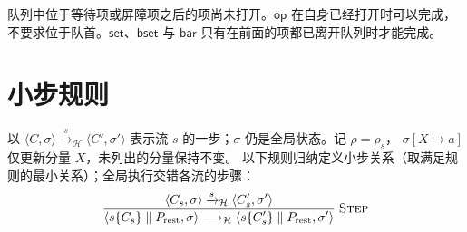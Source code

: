 \documentclass[UTF8,a4paper,11pt,fontset=fandol]{ctexart}
\newcommand{\kw}[1]{\ensuremath{\mathsf{#1}}}
\newcommand{\infer}[2]{\displaystyle\frac{\displaystyle #1}{\displaystyle #2}}
\begin{document}
队列中位于等待项或屏障项之后的项尚未打开。$\kw{op}$ 在自身已经打开时可以完成，不要求位于队首。$\kw{set}$、$\kw{bset}$ 与 $\kw{bar}$ 只有在前面的项都已离开队列时才能完成。

\clearpage
\section{小步规则}

以 $\langle C,\sigma\rangle\xrightarrow{s}_{\mathcal H}\langle C',\sigma'\rangle$
表示流 $s$ 的一步；$\sigma$ 仍是全局状态。记 $\rho=\rho_s$，
$\sigma[X\mapsto a]$ 仅更新分量 $X$，未列出的分量保持不变。
以下规则归纳定义小步关系（取满足规则的最小关系）；全局执行交错各流的步骤：
\[
\infer{\langle C_s,\sigma\rangle\xrightarrow{s}_{\mathcal H}\langle C_s',\sigma'\rangle}
 {\langle s\{C_s\}\parallel P_{\rm rest},\sigma\rangle
 \longrightarrow_{\mathcal H}
 \langle s\{C_s'\}\parallel P_{\rm rest},\sigma'\rangle}
 \;\textsc{Step}
\]
\end{document}
